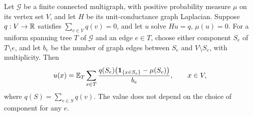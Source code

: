 \begin{lemma}
\label{gr:forest}
Let $\mathcal G$ be a finite connected multigraph, with positive
probability measure $\mu$ on its vertex set $V$, and let $H$ be its
unit-conductance graph Laplacian.  Suppose $q:V\to\mathbb R$ satisfies
$\sum_{v\in V}q(v)=0$, and let $u$ solve
$Hu=q$, $\mu(u)=0$.  For a uniform spanning tree $T$ of $\mathcal G$
and an edge $e\in T$, choose either component $S_e$ of $T\setminus e$,
and let $b_e$ be the number of graph edges between $S_e$ and
$V\setminus S_e$, with multiplicity.  Then
\begin{equation}\label{gr:forest-identity}
 u(x)=\mathbb E_T\sum_{e\in T}
       \frac{q(S_e)\bigl(\mathbf 1_{\{x\in S_e\}}-\mu(S_e)\bigr)}{b_e},
 \qquad x\in V,
\end{equation}
where $q(S)=\sum_{v\in S}q(v)$.  The value does not depend on the
choice of component for any $e$.
\end{lemma}

